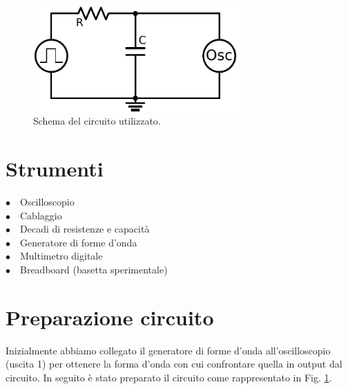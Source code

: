 \begin{figure}
	\centering
    \includegraphics[width=80mm]{schema.pdf}
    \caption{Schema del circuito utilizzato.}
    \label{fig:circuito}
\end{figure}


\section{Strumenti}


$\bullet \quad$Oscilloscopio \\
$\bullet \quad$Cablaggio\\
$\bullet \quad$Decadi di resistenze e capacità\\
$\bullet \quad$Generatore di forme d'onda\\
$\bullet \quad$Multimetro digitale\\
$\bullet \quad$Breadboard (basetta sperimentale)\\

\section{Preparazione circuito}

Inizialmente abbiamo collegato il generatore di forme d'onda all'oscilloscopio (uscita 1) per ottenere la forma d'onda con cui confrontare quella in output dal circuito.
In seguito è stato preparato il circuito come rappresentato in Fig. \ref{fig:circuito}.

